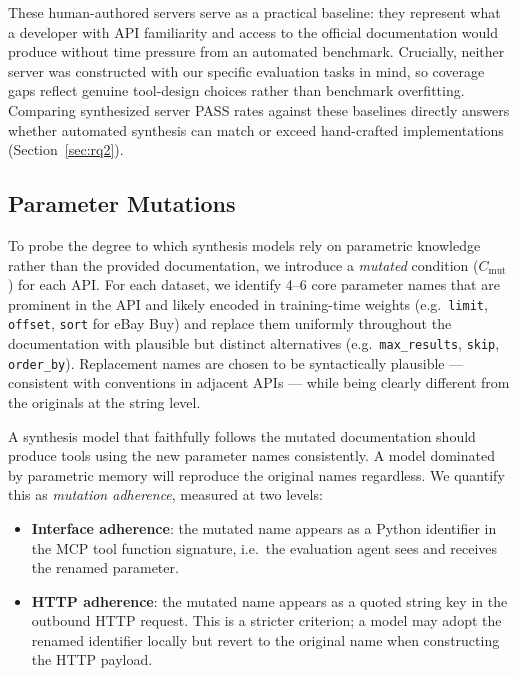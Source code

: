 \documentclass[12pt]{report}
\begin{document}
These human-authored servers serve as a practical baseline: they represent
what a developer with API familiarity and access to the official documentation
would produce without time pressure from an automated benchmark. Crucially,
neither server was constructed with our specific evaluation tasks in mind, so
coverage gaps reflect genuine tool-design choices rather than benchmark
overfitting. Comparing synthesized server PASS rates against these baselines
directly answers whether automated synthesis can match or exceed hand-crafted
implementations (Section~\ref{sec:rq2}).

\subsection{Parameter Mutations}

To probe the degree to which synthesis models rely on parametric knowledge
rather than the provided documentation, we introduce a \emph{mutated}
condition ($C_{\text{mut}}$) for each API. For each dataset, we identify
4--6 core parameter names that are prominent in the API and likely encoded
in training-time weights (e.g.\ \texttt{limit}, \texttt{offset}, \texttt{sort}
for eBay Buy) and replace them uniformly throughout the documentation with
plausible but distinct alternatives (e.g.\ \texttt{max\_results},
\texttt{skip}, \texttt{order\_by}). Replacement names are chosen to be
syntactically plausible --- consistent with conventions in adjacent APIs ---
while being clearly different from the originals at the string level.

A synthesis model that faithfully follows the mutated documentation should
produce tools using the new parameter names consistently. A model dominated
by parametric memory will reproduce the original names regardless. We
quantify this as \emph{mutation adherence}, measured at two levels:

\begin{itemize}
  \item \textbf{Interface adherence}: the mutated name appears as a Python
    identifier in the MCP tool function signature, i.e.\ the evaluation agent
    sees and receives the renamed parameter.
  \item \textbf{HTTP adherence}: the mutated name appears as a quoted string
    key in the outbound HTTP request. This is a stricter criterion; a model
    may adopt the renamed identifier locally but revert to the original name
    when constructing the HTTP payload.
\end{itemize}
\end{document}
